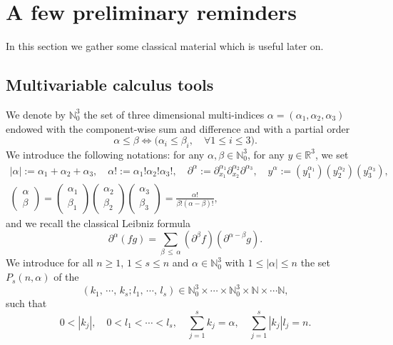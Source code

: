 \documentclass[10pt]{amsart}
\theoremstyle{definition}\newtheorem{defi}[theo]{Definition}\newtheorem{rema}[theo]{Remark}\newtheorem{exam}[theo]{Example}\newtheorem{exem}[theo]{Example}\newtheorem{nota}[theo]{Notation}
\newcommand{\R}{\mathbb{R}}
\newcommand{\N}{\mathbb{N}}
\renewcommand{\leq}{\leqslant}
\renewcommand{\geq}{\geqslant}
\let\oldforall\forall
\renewcommand*{\forall}{\mathrel{\oldforall}}
\begin{document}
\section{A few preliminary reminders}

In this section we gather some classical material which is useful later on.

\subsection{Multivariable calculus tools}

We denote by $\N_0^3$ the set of three dimensional multi-indices $\alpha=(\alpha_1,\alpha_2,\alpha_3)$ endowed with the component-wise sum and difference and with a partial order
\[
\alpha \leq \beta \Leftrightarrow \Big(\alpha_i \leq \beta_i,\quad \forall 1 \leq i \leq 3 \Big).
\]
We introduce the following notations: for any $\alpha,\beta \in \N_0^3$, for any $y\in\R^3$, we set
\begin{gather*}
|\alpha|:= \alpha_1+\alpha_2+\alpha_3,\quad
\alpha! := \alpha_1! \alpha_2!\alpha_3!,\quad
\partial^\alpha :=\partial_{x_1}^{\alpha_1}\partial_{x_2}^{\alpha_2} \partial^{\alpha_3},\quad y^\alpha :=\left(y_1^{\alpha_1}\right) \left(y_2^{\alpha_2} \right) \left(y_3^{\alpha_3}\right),\\
\begin{pmatrix}
\alpha \\
\beta
\end{pmatrix}=
\begin{pmatrix}
\alpha_1 \\
\beta_1
\end{pmatrix}
\begin{pmatrix}
\alpha_2 \\
\beta_2
\end{pmatrix}
\begin{pmatrix}
\alpha_3 \\
\beta_3
\end{pmatrix}= \frac{\alpha!}{\beta!(\alpha-\beta)!},
\end{gather*}
and we recall the classical Leibniz formula
\[
\partial^\alpha (fg) = \underset{\beta\,\leq\,\alpha}{\sum} \left(\partial^\beta f\right) \left(\partial^{\alpha-\beta} g\right).
\]
We introduce for all $n\geq1$, $1\leq s \leq n$ and $\alpha \in \N_0^3$ with $1 \leq |\alpha|\leq n$ the set $P_s(n,\alpha)$ of the
\[
(k_1,\,\cdots,\,k_s;l_1,\,\cdots,\,l_s)\in \N_0^3\times \cdots\times \N_0^3 \times \N \times \cdots \N,
\]
such that
\[
0<|k_j|,\quad 0<l_1<\cdots<l_s,\quad \underset{j=1}{\overset{s}{\sum}}k_j=\alpha,\quad \underset{j=1}{\overset{s}{\sum}}|k_j| l_j=n.
\]
\end{document}
